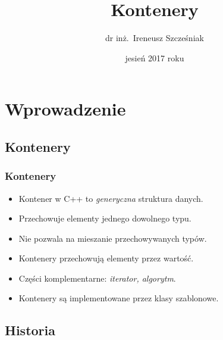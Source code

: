 \documentclass[compress]{beamer}
\title{Kontenery}
\author{dr inż.~Ireneusz Szcześniak}
\date{jesień 2017 roku}
\begin{document}

\begin{frame}[plain]
  \titlepage
\end{frame}


\section{Wprowadzenie}

\subsection{Kontenery}

\begin{frame}

  \frametitle{Kontenery}

  \begin{itemize}
  \item Kontener w C++ to \emph{generyczna} struktura danych.
  \item Przechowuje elementy jednego dowolnego typu.
  \item Nie pozwala na mieszanie przechowywanych typów.
  \item Kontenery przechowują elementy przez wartość.
  \item Części komplementarne: \emph{iterator, algorytm}.
  \item Kontenery są implementowane przez klasy szablonowe.
  \end{itemize}

\end{frame}


\subsection{Historia}
\end{document}
